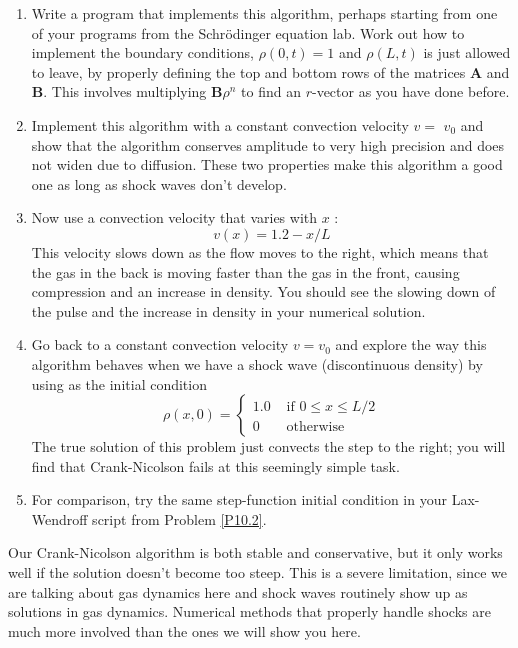 \begin{problem}\label{P10.3}

\begin{enumerate}[label=(\alph*)]
\item  Write a program that implements this algorithm, perhaps starting from one of your programs from the Schr{\"o}dinger equation lab. Work out how to implement the boundary conditions, $\rho(0, t)=1$ and $\rho(L, t)$ is just allowed to leave, by properly defining the top and bottom rows of the matrices $\mathbf{A}$ and $\mathbf{B}$. This involves multiplying $\mathbf{B} \rho^{n}$ to find an $r$-vector as you have done before.
\item  Implement this algorithm with a constant convection velocity $v=$ $v_{0}$ and show that the algorithm conserves amplitude to very high precision and does not widen due to diffusion. These two properties make this algorithm a good one as long as shock waves don\rq t develop.
\item Now use a convection velocity that varies with $x$ :
\begin{equation}\label{eq:1019}
v(x)=1.2-x / L
\end{equation}
This velocity slows down as the flow moves to the right, which means
that the gas in the back is moving faster than the gas in the front,
causing compression and an increase in density. You should see the
slowing down of the pulse and the increase in density in your numerical solution.
\item Go back to a constant convection velocity $v = v_0$ and explore the way
this algorithm behaves when we have a shock wave (discontinuous
density) by using as the initial condition
\begin{equation}\label{eq:1020}
\rho(x, 0)= \begin{cases}1.0 & \text { if } 0 \leq x \leq L / 2 \\ 0 & \text { otherwise }\end{cases}
\end{equation}
The true solution of this problem just convects the step to the right;
you will find that Crank-Nicolson fails at this seemingly simple task.
\item For comparison, try the same step-function initial condition in your
Lax-Wendroff script from Problem \ref{P10.2}.
\end{enumerate}
\end{problem}
Our Crank-Nicolson algorithm is both stable and conservative, but it only
works well if the solution doesn\rq t become too steep. This is a severe limitation,
since we are talking about gas dynamics here and shock waves routinely show up
as solutions in gas dynamics. Numerical methods that properly handle shocks
are much more involved than the ones we will show you here.

